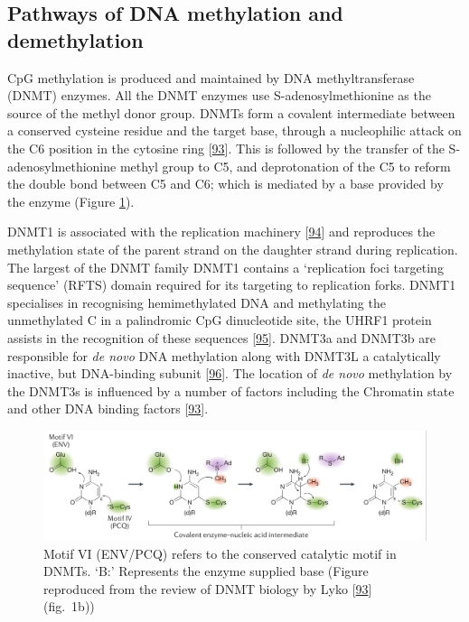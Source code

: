 \documentclass[
]{book}
\begin{document}
\hypertarget{pathways-of-dna-methylation-and-demethylation}{%
\subsection{Pathways of DNA methylation and demethylation}\label{pathways-of-dna-methylation-and-demethylation}}

CpG methylation is produced and maintained by DNA methyltransferase (DNMT) enzymes.
All the DNMT enzymes use S-adenosylmethionine as the source of the methyl donor group.
DNMTs form a covalent intermediate between a conserved cysteine residue and the target base, through a nucleophilic attack on the C6 position in the cytosine ring {[}\protect\hyperlink{ref-Lyko2017}{93}{]}.
This is followed by the transfer of the S-adenosylmethionine methyl group to C5, and deprotonation of the C5 to reform the double bond between C5 and C6; which is mediated by a base provided by the enzyme (Figure \ref{fig:Lyko2017DNAmMechanism}).

DNMT1 is associated with the replication machinery {[}\protect\hyperlink{ref-Vertino2002}{94}{]} and reproduces the methylation state of the parent strand on the daughter strand during replication.
The largest of the DNMT family DNMT1 contains a `replication foci targeting sequence' (RFTS) domain required for its targeting to replication forks.
DNMT1 specialises in recognising hemimethylated DNA and methylating the unmethylated C in a palindromic CpG dinucleotide site, the UHRF1 protein assists in the recognition of these sequences {[}\protect\hyperlink{ref-Bostick2007}{95}{]}.
DNMT3a and DNMT3b are responsible for \emph{de novo} DNA methylation along with DNMT3L a catalytically inactive, but DNA-binding subunit {[}\protect\hyperlink{ref-Jia2009}{96}{]}.
The location of \emph{de novo} methylation by the DNMT3s is influenced by a number of factors including the Chromatin state and other DNA binding factors {[}\protect\hyperlink{ref-Lyko2017}{93}{]}.

\begin{figure}

{\centering \includegraphics[width=0.8\linewidth]{figs/Lyko2017DNAmMechanism} 

}

\caption{Motif VI (ENV/PCQ) refers to the conserved catalytic motif in DNMTs. `B:' Represents the enzyme supplied base (Figure reproduced from the review of DNMT biology by Lyko {[}\protect\hyperlink{ref-Lyko2017}{93}{]} (fig.~1b))}\label{fig:Lyko2017DNAmMechanism}
\end{figure}
\end{document}
